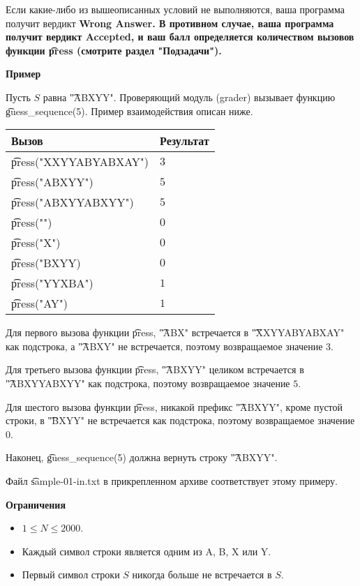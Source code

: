 Если какие-либо из вышеописанных условий не выполняются, ваша программа получит вердикт \bf{Wrong Answer}. В противном случае, ваша программа получит вердикт \bf{Accepted}, и ваш балл определяется количеством вызовов функции \t{press} (смотрите раздел "Подзадачи").

\bf{Пример}

Пусть $S$ равна \t{"ABXYY"}. Проверяющий модуль (grader) вызывает функцию \t{guess_sequence(5)}. Пример взаимодействия описан ниже.

\begin{tabular}{|l|l|}\hline
\bf{Вызов}&\bf{Результат}\\\hline
\t{press("XXYYABYABXAY")}&$3$\\\hline
\t{press("ABXYY")}&$5$\\\hline
\t{press("ABXYYABXYY")}&$5$\\\hline
\t{press("")}&$0$\\\hline
\t{press("X")}&$0$\\\hline
\t{press("BXYY)}&$0$\\\hline
\t{press("YYXBA")}&$1$\\\hline
\t{press("AY")}&$1$\\\hline
\end{tabular}



Для первого вызова функции \t{press}, \t{"ABX"} встречается в \t{"XXYYABYABXAY"} как подстрока, а \t{"ABXY"} не встречается, поэтому возвращаемое значение $3$.

Для третьего вызова функции \t{press}, \t{"ABXYY"} целиком встречается в \t{"ABXYYABXYY"} как подстрока, поэтому возвращаемое значение $5$.

Для шестого вызова функции \t{press}, никакой префикс \t{"ABXYY"}, кроме пустой строки, в \t{"BXYY"} не встречается как подстрока, поэтому возвращаемое значение $0$.

Наконец, \t{guess_sequence(5)} должна вернуть строку \t{"ABXYY"}.

Файл \t{sample-01-in.txt} в прикрепленном архиве соответствует этому примеру.

\bf{Ограничения}

\begin{itemize}
\item $1 \le N \le 2000$.
\item Каждый символ строки является одним из A, B, X или Y.
\item Первый символ строки $S$ никогда больше не встречается в $S$.
\end{itemize}


